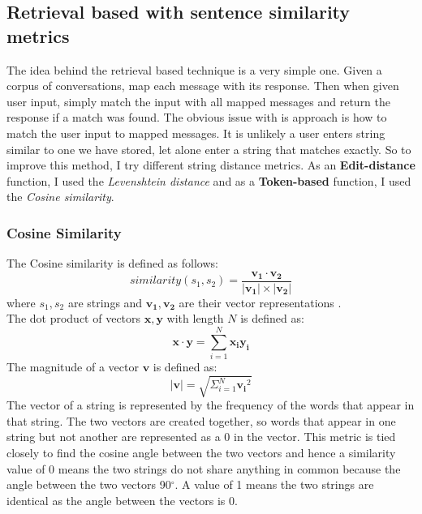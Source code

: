 \documentclass{article}
\newcommand{\n}[0]{\\[\baselineskip]}
\begin{document}
\subsection{Retrieval based with sentence similarity metrics} \label{retrieval}
The idea behind the retrieval based technique is a very simple one. Given a corpus of conversations, map each message with its response. Then when given user input, simply match the input with all mapped messages and return the response if a match was found. The obvious issue with is approach is how to match the user input to mapped messages. It is unlikely a user enters string similar to one we have stored, let alone enter a string that matches exactly. So to improve this method, I try different string distance metrics. As an \textbf{Edit-distance} function, I used the \textit{Levenshtein distance} and as a \textbf{Token-based} function, I used the \textit{Cosine similarity}.
\subsubsection{Cosine Similarity}
The Cosine similarity is defined as follows:
\begin{equation*}
similarity(s_{1}, s_{2}) = \frac{\mathbf{v_{1}} \cdot \mathbf{v_{2}}}{|\mathbf{v_{1}}|\times|\mathbf{v_{2}}|}
\end{equation*}
where $s_{1}, s_{2}$ are strings and $\mathbf{v_{1}}, \mathbf{v_{2}}$ are their vector representations \cite{irbook}.
\n
The dot product of vectors $\mathbf{x}, \mathbf{y}$ with length $N$ is defined as:
\begin{equation*}
\mathbf{x} \cdot \mathbf{y} = \sum_{i=1}^{N}\mathbf{x_{i}} \mathbf{y_{i}}
\end{equation*}
The magnitude of a vector $\mathbf{v}$ is defined as:
\begin{equation*}
|\mathbf{v}| = \sqrt{\Sigma_{i=1}^{N}\mathbf{v_{i}}^2}
\end{equation*}
The vector of a string is represented by the frequency of the words that appear in that string. The two vectors are created together, so words that appear in one string but not another are represented as a 0 in the vector. This metric is tied closely to find the cosine angle between the two vectors and hence a similarity value of 0 means the two strings do not share anything in common because the angle between the two vectors 90$^{\circ}$. A value of 1 means the two strings are identical as the angle between the vectors is 0. 
\end{document}
